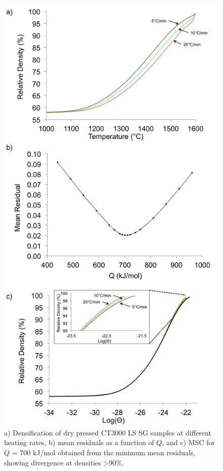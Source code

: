 \newpage
\begin{figure}[H]
	\centering
	\includegraphics[scale=0.4]{Chapter-6/Figures/Figure7.png}
	\caption{a) Densification of dry pressed CT3000 LS SG samples at different heating rates, b) mean residuals as a function of $Q$, and c) MSC for $Q$ = 700 kJ/mol obtained from the minimum mean residuals, showing divergence at densities >90\%.}
	\label{Ch6-figure:Figure7}
\end{figure}

